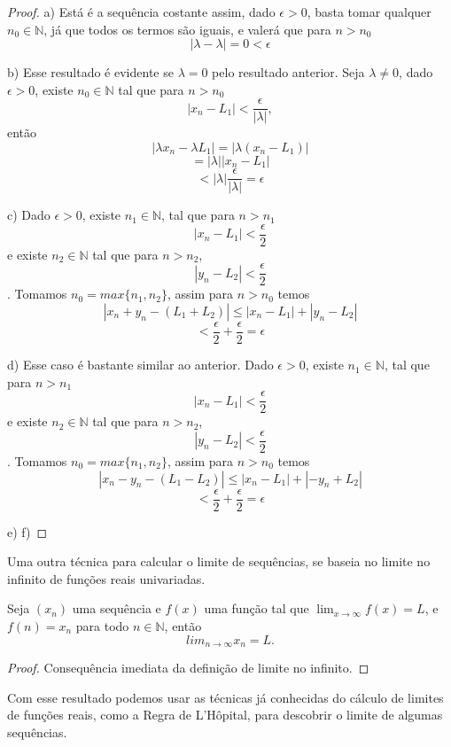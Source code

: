 \begin{proof}
    a) Está é a sequência costante assim, dado $\epsilon > 0$, basta tomar 
    qualquer $n_0 \in \mathbb{N}$, já que todos os termos são iguais, e valerá 
    que para $n>n_0$
    $$|\lambda - \lambda| = 0 < \epsilon$$
    
    b) Esse resultado é evidente se $\lambda = 0$ pelo resultado anterior.
    Seja $\lambda \neq 0$, dado $\epsilon > 0$, existe $n_0 \in \mathbb{N}$ tal 
    que para $n>n_0$
    $$|x_n - L_1| < \frac{\epsilon}{|\lambda|},$$
    então
    $$|\lambda x_n - \lambda L_1| = |\lambda(x_n - L_1)|$$
    $$ = |\lambda| |x_n - L_1|$$
    $$ < |\lambda| \frac{\epsilon}{|\lambda|} = \epsilon$$ 

    c) Dado $\epsilon > 0$, existe $n_1 \in \mathbb{N}$, tal que para $n>n_1$
    $$|x_n - L_1| < \frac{\epsilon}{2}$$
    e existe $n_2 \in \mathbb{N}$ tal que para $n>n_2$,
    $$|y_n - L_2| < \frac{\epsilon}{2} $$.
    Tomamos $n_0 = max\{n_1,n_2\}$, assim para $n > n_0$ temos
    $$|x_n + y_n -(L_1 + L_2)| \leq |x_n - L_1| + |y_n - L_2|$$
    $$ < \frac{\epsilon}{2} + \frac{\epsilon}{2} = \epsilon$$
    
    d) Esse caso é bastante similar ao anterior.
    Dado $\epsilon > 0$, existe $n_1 \in \mathbb{N}$, tal que para $n>n_1$
    $$|x_n - L_1| < \frac{\epsilon}{2}$$
    e existe $n_2 \in \mathbb{N}$ tal que para $n>n_2$,
    $$|y_n - L_2| < \frac{\epsilon}{2} $$.
    Tomamos $n_0 = max\{n_1,n_2\}$, assim para $n > n_0$ temos
    $$|x_n - y_n -(L_1 - L_2)| \leq |x_n - L_1| + |-y_n + L_2|$$
    $$ < \frac{\epsilon}{2} + \frac{\epsilon}{2} = \epsilon$$

    e)
    f)
\end{proof}

Uma outra técnica para calcular o limite de sequências, se baseia no limite no 
infinito de funções reais univariadas.

\begin{teo}
    Seja $(x_n)$ uma sequência e $f(x)$ uma função tal que $\lim_{x \to \infty} 
    f(x) = L$, e $f(n) = x_n$ para todo $n \in \mathbb{N}$, então
    $$lim_{n \to \infty} x_n = L.$$ 
\end{teo}

\begin{proof}
    Consequência imediata da definição de limite no infinito.
\end{proof}

Com esse resultado podemos usar as técnicas já conhecidas do cálculo de limites
de funções reais, como a Regra de L'Hôpital, para descobrir o limite de algumas
sequências.

